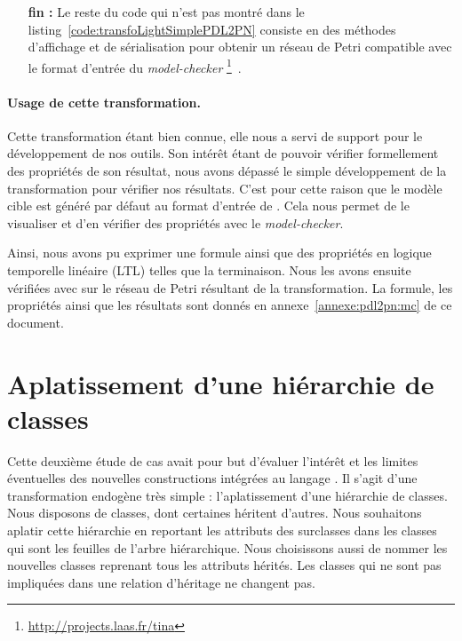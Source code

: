 \begin{itemize}
  \item[\textbf{fin :}] Le reste du code qui n'est pas montré dans le
    listing~\ref{code:transfoLightSimplePDL2PN} consiste en des méthodes
    d'affichage et de sérialisation pour obtenir un réseau de Petri compatible
    avec le format d'entrée du \emph{model-checker}
    {\tina}\footnote{\url{http://projects.laas.fr/tina}}~\cite{Berthomieu2004}.

\end{itemize}

\begin{figure}[h]
  \begin{center}
    
  \end{center}
\end{figure}

\paragraph{Usage de cette transformation.}Cette transformation étant bien
connue, elle nous a servi de support pour le développement de nos outils. Son
intérêt étant de pouvoir vérifier formellement des propriétés de son résultat,
nous avons dépassé le simple développement de la transformation pour vérifier
nos résultats. C'est pour cette raison que le modèle cible est généré par
défaut au format d'entrée de {\tina}. Cela nous permet de le visualiser et d'en
vérifier des propriétés avec le \emph{model-checker}. 

Ainsi, nous avons pu exprimer une formule ainsi que des propriétés en logique
temporelle linéaire (LTL) telles que la terminaison. Nous les avons ensuite
vérifiées avec {\tina} sur le réseau de Petri résultant de la transformation.
La formule, les propriétés ainsi que les résultats sont donnés en
annexe~\ref{annexe:pdl2pn:mc} de ce document.


\FloatBarrier

\section{Aplatissement d'une hiérarchie de classes}
\label{sec:aplatissement}

Cette deuxième étude de cas avait pour but d'évaluer l'intérêt et les limites
éventuelles des nouvelles constructions intégrées au langage {\tom}. Il s'agit
d'une transformation endogène très simple : l'aplatissement d'une hiérarchie de
classes. Nous disposons de classes, dont certaines héritent d'autres. Nous
souhaitons aplatir cette hiérarchie en reportant les attributs des surclasses
dans les classes qui sont les feuilles de l'arbre hiérarchique. Nous
choisissons aussi de nommer les nouvelles classes reprenant tous les attributs
hérités. Les classes qui ne sont pas impliquées dans une relation d'héritage ne
changent pas.

